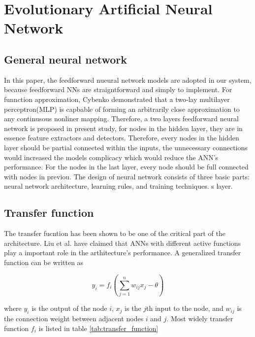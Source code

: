 \section{Evolutionary Artificial Neural Network}

\subsection{General neural network}

In this paper, the feedforward nueural network models are adopted in our
system, because feedforward NNs are straigntforward and simply to implement.  For
funnction approximation, Cybenko demonstrated that a two-lay multilayer
perceptron(MLP) is capbable of forming an arbitrarily close approximation to
any continusous nonliner mapping\cite{cybenko1989approximation}. Therefore, a
two layers feedforward neural network is proposed in present study, for nodes
in the hidden layer, they are in essence feature extractors and detectors.
Therefore, every nodes in the hidden layer should be partial connected within
the inputs, the unnecessary connections would increased the models complicacy
which would reduce the ANN's performance. For the nodes in the last layer,
every node should be full connected with nodes in previou. The design of neural
network consists of three basic parts: neural network architecture, learning
rules, and training techniques.
s layer.


\subsection{Transfer function}
The transfer fucntion has been shown to be one of the critical part of the
architecture. Liu \cite{liu1996evolutionary} et al. have claimed that ANNs with
different active functions play a important role in the arthitecture's performance.
A generalized transfer function can be written as

\begin{equation}
	y_i = f_i(\sum_{j=1}^n{w_{ij}x_j - \theta})
\end{equation}

where $y_i$ is the output of the node $i$, $x_j$ is the $j$th input to the node,
and $w_{ij}$ is the connection weight between adjacent nodes $i$ and $j$. Most
widely transfer function  $f_i$ is listed in table \ref{tab:transfer_function}



